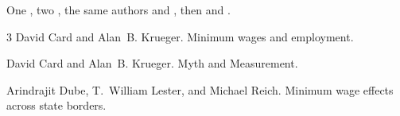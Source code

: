 \documentclass{article}
\begin{document}
One \citep{card1994}, two \citep{card1994,dube2010}, the same authors \citep{card1994,card1995} and
\citet{card1994,card1995}, then \citet{card1994,dube2010} and \citep[e.g.][p.~5]{dube2010,card1995}.


\begin{thebibliography}{3}
David Card and Alan~B. Krueger. Minimum wages and employment.

David Card and Alan~B. Krueger. Myth and Measurement.

Arindrajit Dube, T.~William Lester, and Michael Reich. Minimum wage effects across state borders.
\end{thebibliography}
\end{document}
